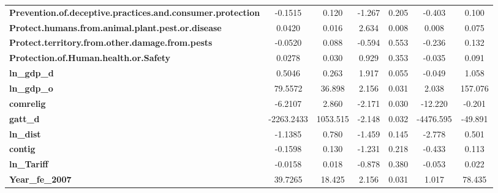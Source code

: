 \begin{center}
\begin{tabular}{lcccccc}
\textbf{Prevention.of.deceptive.practices.and.consumer.protection} &      -0.1515  &        0.120     &    -1.267  &         0.205        &       -0.403    &        0.100     \\
\textbf{Protect.humans.from.animal.plant.pest.or.disease}          &       0.0420  &        0.016     &     2.634  &         0.008        &        0.008    &        0.075     \\
\textbf{Protect.territory.from.other.damage.from.pests}            &      -0.0520  &        0.088     &    -0.594  &         0.553        &       -0.236    &        0.132     \\
\textbf{Protection.of.Human.health.or.Safety}                      &       0.0278  &        0.030     &     0.929  &         0.353        &       -0.035    &        0.091     \\
\textbf{ln\_gdp\_d}                                                &       0.5046  &        0.263     &     1.917  &         0.055        &       -0.049    &        1.058     \\
\textbf{ln\_gdp\_o}                                                &      79.5572  &       36.898     &     2.156  &         0.031        &        2.038    &      157.076     \\
\textbf{comrelig}                                                  &      -6.2107  &        2.860     &    -2.171  &         0.030        &      -12.220    &       -0.201     \\
\textbf{gatt\_d}                                                   &   -2263.2433  &     1053.515     &    -2.148  &         0.032        &    -4476.595    &      -49.891     \\
\textbf{ln\_dist}                                                  &      -1.1385  &        0.780     &    -1.459  &         0.145        &       -2.778    &        0.501     \\
\textbf{contig}                                                    &      -0.1598  &        0.130     &    -1.231  &         0.218        &       -0.433    &        0.113     \\
\textbf{ln\_Tariff}                                                &      -0.0158  &        0.018     &    -0.878  &         0.380        &       -0.053    &        0.022     \\
\textbf{Year\_fe\_2007}                                            &      39.7265  &       18.425     &     2.156  &         0.031        &        1.017    &       78.435     \\

\end{tabular}
\end{center}
